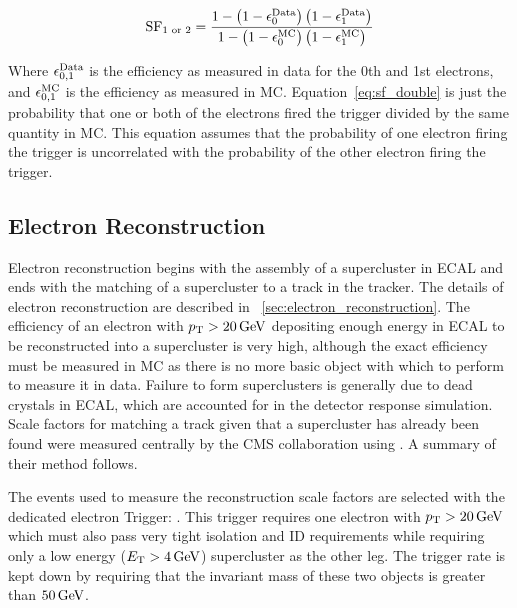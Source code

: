 \begin{equation} \label{eq:sf_double}
    \text{SF}_{1 \text{ or } 2}
    =
    \frac{
        1 - \left( 1 - \epsilon^{\text{Data}}_{0} \right) \left( 1 - \epsilon^{\text{Data}}_{1} \right)
    } {
        1 - \left( 1 - \epsilon^{\text{MC}}_{0} \right) \left( 1 - \epsilon^{\text{MC}}_{1} \right)
    }
\end{equation}

Where $\epsilon^{\text{Data}}_{0,1}$ is the efficiency as measured in data for the 0th and
1st electrons, and $\epsilon^{\text{MC}}_{0,1}$ is the efficiency as measured in MC.
Equation~\ref{eq:sf_double} is just the probability that one or both of the
electrons fired the trigger divided by the same quantity in MC. This equation
assumes that the probability of one electron firing the trigger is uncorrelated
with the probability of the other electron firing the trigger.





\subsection{Electron Reconstruction}
\label{ssec:sf_reconstruction}

Electron reconstruction begins with the assembly of a supercluster in ECAL and
ends with the matching of a supercluster to a track in the tracker. The details
of electron reconstruction are described in
\SEC~\ref{sec:electron_reconstruction}. The efficiency of an electron with $p_{\mathrm{T}}
> 20 \,\text{Ge\hspace{-.08em}V}$ depositing enough energy in ECAL to be reconstructed into a
supercluster is very high, although the exact efficiency must be measured in
MC as there is no more basic object with which to perform \TnP to measure it in
data. Failure to form superclusters is generally due to dead crystals in ECAL,
which are accounted for in the detector response simulation. Scale factors for
matching a track given that a supercluster has already been found were measured
centrally by the CMS collaboration using \TnP \cite{gsf_scale_factors_2013}. A
summary of their method follows.

The events used to measure the reconstruction scale factors are selected with the
dedicated electron \TnP Trigger: \TnPTrigger. This trigger requires one
electron with $p_{\mathrm{T}} > 20 \,\text{Ge\hspace{-.08em}V}$ which must also pass very tight isolation and ID
requirements while requiring only a low energy ($E_{\mathrm{T}} > 4 \,\text{Ge\hspace{-.08em}V}$) supercluster as
the other leg. The trigger rate is kept down by requiring that the invariant
mass of these two objects is greater than $50 \,\text{Ge\hspace{-.08em}V}$.


